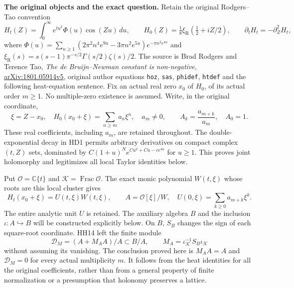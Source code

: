 \documentclass[11pt,a4paper]{article}
\theoremstyle{definition}\newtheorem{definition}[theorem]{Definition}
\begin{document}
\HD\textbf{The original objects and the exact question.}
Retain the original Rodgers--Tao convention
\[
 H_t(Z)=\int_0^\infty e^{tu^2}\Phi(u)\cos(Zu)\,du,\qquad
 H_0(Z)=\tfrac18\xi_{\mathrm R}(\tfrac12+iZ/2),\qquad
 \partial_tH_t=-\partial_Z^2H_t,
 \tag{HD1}\label{hd:heat}
\]
where
$\Phi(u)=\sum_{n\ge1}(2\pi^2n^4e^{9u}-3\pi n^2e^{5u})
e^{-\pi n^2e^{4u}}$ and
$\xi_{\mathrm R}(s)=s(s-1)\pi^{-s/2}\Gamma(s/2)\zeta(s)/2$.
The source is Brad Rodgers and Terence Tao,
\emph{The de Bruijn--Newman constant is non-negative},
\href{https://arxiv.org/abs/1801.05914v5}{arXiv:1801.05914v5},
original author equations \texttt{hoz}, \texttt{sas},
\texttt{phidef}, \texttt{htdef} and the following heat-equation sentence.
Fix an actual real zero $x_0$ of $H_0$, of its actual order $m\ge1$.
No multiple-zero existence is assumed. Write, in the original coordinate,
\[
 \xi=Z-x_0,\quad H_0(x_0+\xi)=\sum_{n\ge m}a_n\xi^n,\quad
 a_m\ne0,\qquad A_k=\frac{a_{m+k}}{a_m},\quad A_0=1.
 \tag{HD2}
\]
These real coefficients, including $a_m$, are retained throughout.
The double-exponential decay in HD1 permits arbitrary derivatives
on compact complex $(t,Z)$ sets, dominated by
$C(1+u)^N e^{C u^2+Cu-ce^{4u}}$ for $u\ge1$.
This proves joint holomorphy and legitimizes all local Taylor
identities below.

Put $\mathcal O=\mathbb C\{t\}$ and
$\mathcal K=\operatorname{Frac}\mathcal O$.
The exact monic polynomial $W(t,\xi)$ whose roots are this local
cluster gives
\[
 H_t(x_0+\xi)=U(t,\xi)W(t,\xi),\qquad
 A=\mathcal O[\xi]/W,\quad U(0,\xi)=\sum_{k\ge0}a_{m+k}\xi^k .
 \tag{HD3}\label{hd:original}
\]
The entire analytic unit $U$ is retained.
The auxiliary algebra $B$ and the inclusion $\iota:A\hookrightarrow B$
will be constructed explicitly below. On $B$, $S_B$ changes the
sign of each square-root coordinate. HH14 left the finite module
\[
 \mathcal D_M=(A+M_AA)/A\subset B/A,\qquad
 M_A=\iota_{\mathcal K}^{-1}S_B\iota_{\mathcal K}
 \tag{HD4}\label{hd:defect}
\]
without assuming its vanishing. The conclusion proved here is
$M_AA=A$ and $\mathcal D_M=0$ for every actual multiplicity $m$.
It follows from the heat identities for all the original
coefficients, rather than from a general property of finite
normalization or a presumption that holonomy preserves a lattice.
\end{document}
